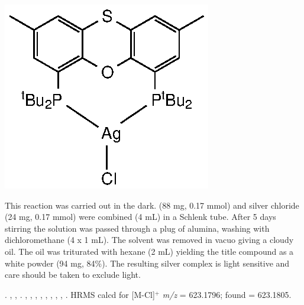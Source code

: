 \begin{structure}[h]
\begin{center}
\includegraphics{../Structures/StBuSilverChloride.eps}
\end{center}
\end{structure}

This reaction was carried out in the dark.   (88 mg, 0.17 mmol) and silver chloride (24 mg, 0.17 mmol) were combined  (4 mL) in a Schlenk tube.  After 5 days stirring the solution was passed through a plug of alumina, washing with dichloromethane (4 x 1 mL).  The solvent was removed in vacuo giving a cloudy oil.  The oil was triturated with hexane (2 mL) yielding the title compound as a white powder (94 mg, 84\%).  The resulting silver complex is light sensitive and care should be taken to exclude light.


.
,
,
.
,
,
,
,
,
, 
, 
,
.
HRMS calcd for  [M-Cl]$^+$ \emph{m/z} = 623.1796; found = 623.1805.



